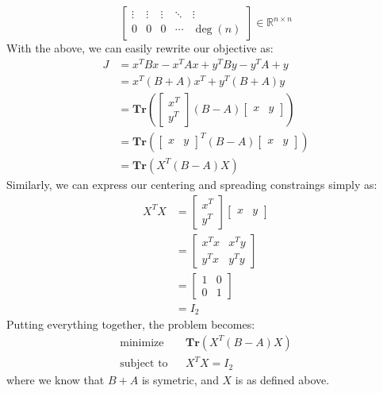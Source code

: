 \documentclass[12pt]{exam}
\begin{document}
\begin{questions}
\begin{solution}
\begin{enumerate}[label=(\alph*)]
\[\begin{bmatrix}
              \vdots & \vdots & \vdots & \ddots & \vdots \\
              0 & 0 & 0 & \cdots & \deg(n) 
            \end{bmatrix} \in \mathbb{R}^{n \times n}
        \]
        With the above, we can easily rewrite our objective as:
        \begin{align*}
          J &= x^TBx - x^TAx + y^TBy - y^TA+y \\
          &= x^T(B + A)x^T + y^T(B + A)y \\
          &= \textbf{Tr}\left(\begin{bmatrix}
            x^T \\
            y^T
          \end{bmatrix}(B - A)
          \begin{bmatrix}
            x & y
          \end{bmatrix}\right) \\
          &= \textbf{Tr}\left(\begin{bmatrix}
            x & y
          \end{bmatrix}^T(B - A)
          \begin{bmatrix}
            x & y
          \end{bmatrix}\right) \\
          &= \textbf{Tr}(X^T(B-A)X)
        \end{align*}
        Similarly, we can express our centering and spreading constraings simply as:
        \begin{align*}
          X^TX &= \begin{bmatrix} x^T \\ y^T \end{bmatrix}\begin{bmatrix} x & y \end{bmatrix} \\
          &= \begin{bmatrix}
            x^Tx & x^Ty \\
            y^Tx & y^Ty
          \end{bmatrix} \\
          &= \begin{bmatrix}
            1 & 0 \\
            0 & 1
          \end{bmatrix} \tag{The given constraints} \\
          &= I_2
        \end{align*}
        Putting everything together, the problem becomes:
        \begin{align*}
          \text{minimize} & & \textbf{Tr}(X^T(B-A)X) \\
          \text{subject to} & & X^TX = I_2
        \end{align*}
        where we know that $B + A$ is symetric, and $X$ is as defined above.


\end{enumerate}
\end{solution}
\end{questions}
\end{document}

